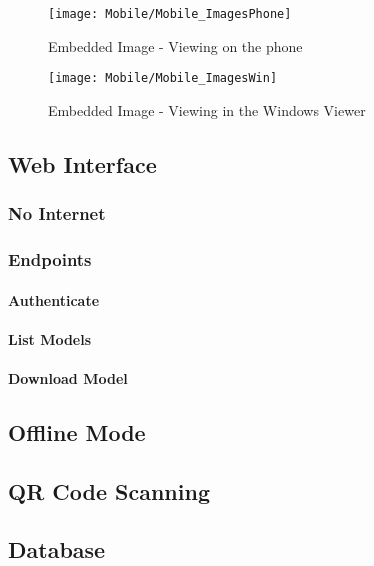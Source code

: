         \begin{figure}[H]
            \texttt{[image: Mobile/Mobile\_ImagesPhone]}
            \centering
            \caption{Embedded Image - Viewing on the phone}
            \label{fig:mobileEmbeddedPhone}
        \end{figure}

        \begin{figure}[H]
            \texttt{[image: Mobile/Mobile\_ImagesWin]}
            \centering
            \caption{Embedded Image - Viewing in the Windows Viewer}
            \label{fig:mobileEmbeddedWindows}
        \end{figure}
        
    \subsection{Web Interface}

        \subsubsection{No Internet}

        \subsubsection{Endpoints}

            \paragraph{Authenticate}

            \paragraph{List Models}

            \paragraph{Download Model}
        
    \subsection{Offline Mode}

    \subsection{QR Code Scanning}

    \subsection{Database}

